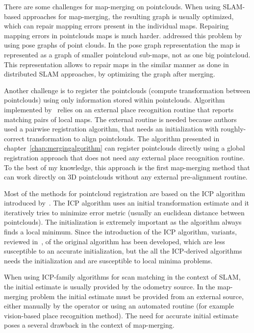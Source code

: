 There are some challenges for map-merging on pointclouds. When using \gls{SLAM}-based approaches for map-merging, the resulting graph is usually optimized, which can repair mapping errors present in the individual maps. Repairing mapping errors in pointclouds maps is much harder. \citet{bonanni2017pose} addressed this problem by using pose graphs of point clouds. In the pose graph representation the map is represented as a graph of smaller pointcloud sub-maps, not as one big pointcloud. This representation allows to repair maps in the similar manner as done in distributed \gls{SLAM} approaches, by optimizing the graph after merging.

Another challenge is to register the pointclouds (compute transformation between pointclouds) using only information stored within pointclouds. Algorithm implemented by~\citet{bonanni2017pose} relies on an external place recognition routine that reports matching pairs of local maps. The external routine is needed because authors used a pairwise registration algorithm, that needs an initialization with roughly-correct transformation to align pointclouds. The algorithm presented in chapter~\ref{chap:mergingalgorithm} can register pointclouds directly using a global registration approach that does not need any external place recognition routine. To the best of my knowledge, this approach is the first map-merging method
that can work directly on \gls{3D} pointclouds without any external pre-alignment routine.

Most of the methods for pointcloud registration are based on the \gls{ICP} algorithm introduced by~\citet{besl1992icp}. The \gls{ICP} algorithm uses an initial transformation estimate and it iteratively tries to minimize error metric (usually an euclidean distance between pointclouds). The initialization is extremely important as the algorithm always finds a local minimum. Since the introduction of the \gls{ICP} algorithm, variants, reviewed in~\citet{pomerleau2015reviewregistration}, of the original algorithm has been developed, which are less susceptible to an accurate initialization, but the all the \gls{ICP}-derived algorithms needs the initialization and are susceptible to local minima problems.

When using \gls{ICP}-family algorithms for scan matching in the context of \gls{SLAM}, the initial estimate is usually provided by the odometry source. In the map-merging problem the initial estimate must be provided from an external source, either manually by the operator or using an automated routine (for example vision-based place recognition method). The need for accurate initial estimate poses a several drawback in the context of map-merging.


